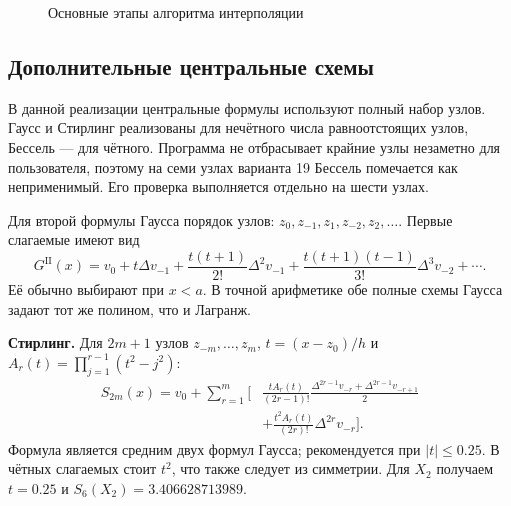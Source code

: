 \documentclass[12pt,a4paper]{article}
\begin{document}
\begin{figure}[H]\centering
{}
\caption{Основные этапы алгоритма интерполяции}
\end{figure}

\clearpage
\subsection{Дополнительные центральные схемы}
В данной реализации центральные формулы используют полный набор узлов.
Гаусс и Стирлинг реализованы для нечётного числа равноотстоящих узлов,
Бессель --- для чётного. Программа не отбрасывает крайние узлы незаметно
для пользователя, поэтому на семи узлах варианта 19 Бессель помечается как
неприменимый. Его проверка выполняется отдельно на шести узлах.

Для второй формулы Гаусса порядок узлов:
$z_0,z_{-1},z_1,z_{-2},z_2,\ldots$.
Первые слагаемые имеют вид
\[
G^{\mathrm{II}}(x)=v_0+t\Delta v_{-1}
+\frac{t(t+1)}{2!}\Delta^2v_{-1}
+\frac{t(t+1)(t-1)}{3!}\Delta^3v_{-2}+\cdots.
\]
Её обычно выбирают при $x<a$. В точной арифметике обе полные схемы Гаусса
задают тот же полином, что и Лагранж.

\textbf{Стирлинг.} Для $2m+1$ узлов $z_{-m},\ldots,z_m$,
$t=(x-z_0)/h$ и $A_r(t)=\prod_{j=1}^{r-1}(t^2-j^2)$:
\begin{align*}
S_{2m}(x)=v_0+\sum_{r=1}^{m}\bigg[&
\frac{tA_r(t)}{(2r-1)!}\frac{\Delta^{2r-1}v_{-r}+\Delta^{2r-1}v_{-r+1}}{2}\\
&+\frac{t^2A_r(t)}{(2r)!}\Delta^{2r}v_{-r}\bigg].
\end{align*}
Формула является средним двух формул Гаусса; рекомендуется при
$|t|\le0.25$. В чётных слагаемых стоит $t^2$, что также следует из симметрии.
Для $X_2$ получаем $t=0.25$ и $S_6(X_2)=3.406628713989$.
\end{document}
